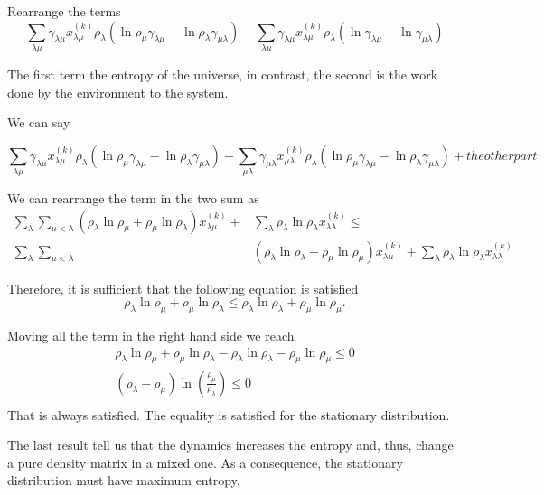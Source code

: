 Rearrange the terms
\begin{equation}
    \sum_{\lambda\mu}\gamma_{\lambda\mu}x^{(k)}_{\lambda\mu}\rho_\lambda\left(\ln\rho_\mu\gamma_{\lambda\mu} - \ln\rho_\lambda\gamma_{\mu\lambda}\right) - \sum_{\lambda\mu}\gamma_{\lambda\mu}x^{(k)}_{\lambda\mu}\rho_\lambda\left(\ln\gamma_{\lambda\mu} - \ln\gamma_{\mu\lambda}\right)
\end{equation}

The first term the entropy of the universe, in contrast, the second is the work done by the environment to the system.

We can say 

\begin{equation}
    \sum_{\lambda\mu}\gamma_{\lambda\mu}x^{(k)}_{\lambda\mu}\rho_\lambda\left(\ln\rho_\mu\gamma_{\lambda\mu} - \ln\rho_\lambda\gamma_{\mu\lambda}\right) - \sum_{\mu\lambda}\gamma_{\mu\lambda}x^{(k)}_{\mu\lambda}\rho_\lambda\left(\ln\rho_\mu\gamma_{\lambda\mu} - \ln\rho_\lambda\gamma_{\mu\lambda}\right) + the other part
\end{equation} 

We can rearrange the term in the two sum as
\begin{equation}
    \begin{split}
        \sum_{\lambda}\sum_{\mu<\lambda}\left(\rho_\lambda\ln\rho_\mu + \rho_\mu\ln\rho_\lambda \right) x^{(k)}_{\lambda\mu} +&\sum_\lambda \rho_\lambda\ln\rho_\lambda x^{(k)}_{\lambda\lambda} \leq\\ 
        \sum_{\lambda}\sum_{\mu<\lambda}&\left(\rho_\lambda\ln\rho_\lambda+ \rho_\mu\ln\rho_\mu\right)x^{(k)}_{\lambda\mu} + \sum_{\lambda}\rho_\lambda\ln\rho_\lambda x_{\lambda\lambda}^{(k)} 
    \end{split}
\end{equation}



Therefore, it is sufficient that the following equation is satisfied
\begin{equation}
    \rho_\lambda\ln\rho_\mu + \rho_\mu\ln\rho_\lambda\leq \rho_\lambda\ln\rho_\lambda+ \rho_\mu\ln\rho_\mu.
\end{equation}

Moving all the term in the right hand side we reach
\begin{equation}
    \begin{split}
        \rho_\lambda\ln\rho_\mu + \rho_\mu\ln\rho_\lambda - \rho_\lambda\ln\rho_\lambda- \rho_\mu\ln\rho_\mu \leq 0\\
        \left(\rho_\lambda-\rho_\mu\right)\ln\left(\frac{\rho_\mu}{\rho_\lambda}\right) \leq0\\
    \end{split}
\end{equation}
That is always satisfied. The equality is satisfied for the stationary distribution.

The last result tell us that the dynamics increases the entropy and, thus, change a pure density matrix in a mixed one.
As a consequence, the stationary distribution must have maximum entropy.